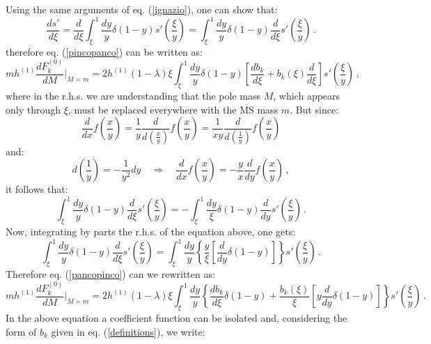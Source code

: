 \documentclass[10pt,a4paper]{article}
\begin{document}
Using the same arguments of eq. (\ref{ignazio}), one can show that:
\begin{equation}
\frac{ds'}{d\xi} = \frac{d}{d\xi}\int_\xi^1\frac{dy}{y}\delta(1-y)s'\left(\frac{\xi}{y}\right) = \int_\xi^1\frac{dy}{y}\delta(1-y)\frac{d}{d\xi}s'\left(\frac{\xi}{y}\right)\,.
\end{equation}
therefore eq. (\ref{pincopanco}) can be written as:
\begin{equation}\label{pancopinco}
mh^{(1)}\frac{dF^{(0)}_k}{dM}\bigg|_{M=m} = 2h^{(1)}(1-\lambda)\xi\int_\xi^1\frac{dy}{y}\delta(1-y)\left[\frac{db_k}{d\xi}+b_k(\xi)\frac{d}{d\xi}\right]s'\left(\frac{\xi}{y}\right)\,,
\end{equation}
where in the r.h.s. we are understanding that the pole mass $M$, which appears only through $\xi$, must be replaced everywhere with the $\overline{\mbox{MS}}$ mass $m$. But since:
\begin{equation}
\frac{d}{dx}f\left(\frac{x}{y}\right) = \frac1{y}\frac{d}{d\left(\frac{x}{y}\right)}f\left(\frac{x}{y}\right) = \frac1{xy}\frac{d}{d\left(\frac{1}{y}\right)}f\left(\frac{x}{y}\right)
\end{equation}
and:
\begin{equation}
d\left(\frac1y\right) = -\frac1{y^2}dy\quad\Rightarrow \quad \frac{d}{dx}f\left(\frac{x}{y}\right) = -\frac{y}{x}\frac{d}{dy}f\left(\frac{x}{y}\right)\,,
\end{equation}
it follows that:
\begin{equation}
\int_\xi^1\frac{dy}y\delta(1-y)\frac{d}{d\xi}s'\left(\frac{\xi}{y}\right) = -\int_\xi^1\frac{dy}\xi\delta(1-y)\frac{d}{dy}s'\left(\frac{\xi}{y}\right)\,.
\end{equation}
Now, integrating by parts the r.h.s. of the equation above, one gets:
\begin{equation}
\int_\xi^1\frac{dy}y\delta(1-y)\frac{d}{d\xi}s'\left(\frac{\xi}{y}\right)=\int_\xi^1\frac{dy}y\left\{\frac{y}{\xi}\left[\frac{d}{dy}\delta(1-y)\right]\right\}s'\left(\frac{\xi}{y}\right)\,.
\end{equation}
Therefore eq. (\ref{pancopinco}) can we rewritten as:
\begin{equation}
mh^{(1)}\frac{dF^{(0)}_k}{dM}\bigg|_{M=m} = 2h^{(1)}(1-\lambda)\xi\int_\xi^1\frac{dy}{y}\left\{\frac{db_k}{d\xi}\delta(1-y)+\frac{b_k(\xi)}{\xi}\left[y\frac{d}{dy}\delta(1-y)\right]\right\}s'\left(\frac{\xi}{y}\right)\,.
\end{equation}
In the above equation a coefficient function can be isolated and, considering the form of $b_k$ given in eq. (\ref{definitions}), we write:
\end{document}
